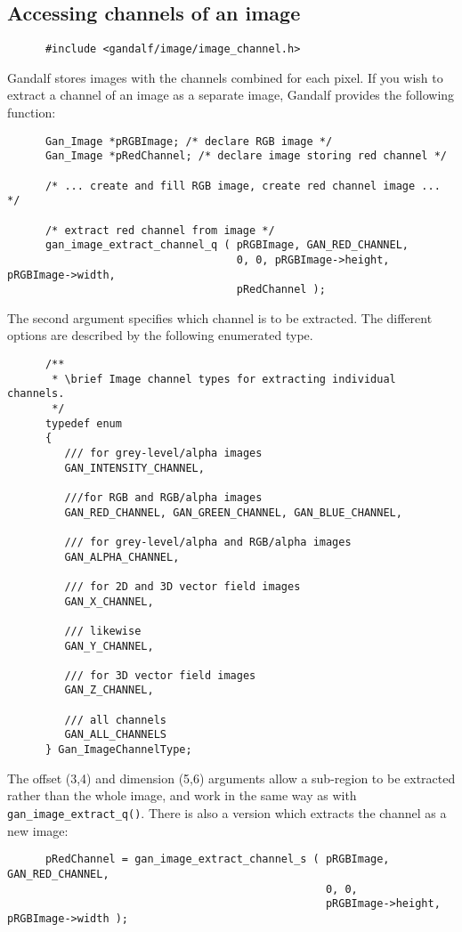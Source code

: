 \subsection{Accessing channels of an image}
\begin{verbatim}
      #include <gandalf/image/image_channel.h>
\end{verbatim}
Gandalf stores images with the channels combined for each pixel.
If you wish to extract a channel of an image as a separate image, Gandalf
provides the following function:
\begin{verbatim}
      Gan_Image *pRGBImage; /* declare RGB image */
      Gan_Image *pRedChannel; /* declare image storing red channel */

      /* ... create and fill RGB image, create red channel image ... */

      /* extract red channel from image */
      gan_image_extract_channel_q ( pRGBImage, GAN_RED_CHANNEL,
                                    0, 0, pRGBImage->height, pRGBImage->width,
                                    pRedChannel );
\end{verbatim}
The second argument specifies which channel is to be extracted.
The different options are described by the following enumerated type.
\begin{verbatim}
      /**
       * \brief Image channel types for extracting individual channels.
       */
      typedef enum
      {
         /// for grey-level/alpha images
         GAN_INTENSITY_CHANNEL,

         ///for RGB and RGB/alpha images
         GAN_RED_CHANNEL, GAN_GREEN_CHANNEL, GAN_BLUE_CHANNEL,

         /// for grey-level/alpha and RGB/alpha images
         GAN_ALPHA_CHANNEL,

         /// for 2D and 3D vector field images
         GAN_X_CHANNEL,

         /// likewise
         GAN_Y_CHANNEL,

         /// for 3D vector field images
         GAN_Z_CHANNEL,

         /// all channels
         GAN_ALL_CHANNELS
      } Gan_ImageChannelType;
\end{verbatim}
The offset (3,4) and dimension (5,6) arguments allow a sub-region to
be extracted rather than the whole image, and work in the same way
as with {\tt gan\_image\_extract\_q()}. There is also a version which
extracts the channel as a new image:
\begin{verbatim}
      pRedChannel = gan_image_extract_channel_s ( pRGBImage, GAN_RED_CHANNEL,
                                                  0, 0,
                                                  pRGBImage->height, pRGBImage->width );
\end{verbatim}

